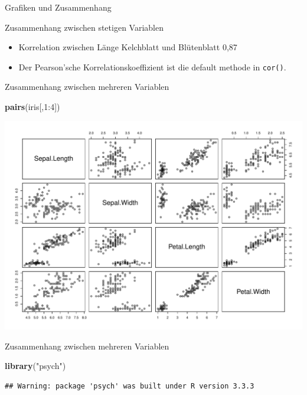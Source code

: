 \documentclass[ignorenonframetext,]{beamer}
\newenvironment{Shaded}{}{}
\newcommand{\KeywordTok}[1]{\textcolor[rgb]{0.00,0.44,0.13}{\textbf{{#1}}}}
\newcommand{\DecValTok}[1]{\textcolor[rgb]{0.25,0.63,0.44}{{#1}}}
\newcommand{\StringTok}[1]{\textcolor[rgb]{0.25,0.44,0.63}{{#1}}}
\newcommand{\NormalTok}[1]{{#1}}
\providecommand{\tightlist}{%
\setlength{\itemsep}{0pt}\setlength{\parskip}{0pt}}
\begin{document}
\begin{frame}[fragile]{Grafiken und Zusammenhang}
\begin{block}{Zusammenhang zwischen stetigen Variablen}
\begin{itemize}
\tightlist
\item
  Korrelation zwischen Länge Kelchblatt und Blütenblatt 0,87
\item
  Der Pearson'sche Korrelationskoeffizient ist die default methode in
  \texttt{cor()}.
\end{itemize}

\end{block}

\begin{block}{Zusammenhang zwischen mehreren Variablen}

\begin{Shaded}
\begin{Highlighting}[]
\KeywordTok{pairs}\NormalTok{(iris[,}\DecValTok{1}\NormalTok{:}\DecValTok{4}\NormalTok{])}
\end{Highlighting}
\end{Shaded}

\includegraphics{R_intern_files/figure-beamer/unnamed-chunk-205-1.pdf}

\end{block}

\begin{block}{Zusammenhang zwischen mehreren Variablen}

\begin{Shaded}
\begin{Highlighting}[]
\KeywordTok{library}\NormalTok{(}\StringTok{"psych"}\NormalTok{)}
\end{Highlighting}
\end{Shaded}

\begin{verbatim}
## Warning: package 'psych' was built under R version 3.3.3
\end{verbatim}


\end{block}
\end{frame}
\end{document}
